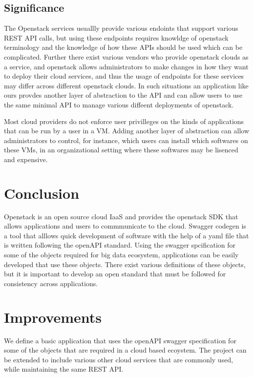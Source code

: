 \subsection{Significance}
The Openstack services usuallly provide various endoints that support
various REST API calls, but using these endpoints requires knowldge of
openstack terminology and the knowledge of how these APIs should be
used which can be complicated. Further there exist various vendors who
provide openstack clouds as a service, and openstack allows
administrators to make changes in how they want to deploy their cloud
services, and thus the usage of endpoints for these services may
differ across different openstack clouds. In such situations an
application like ours provdes another layer of abstraction to the API
and can allow users to use the same minimal API to manage various
diffeent deployments of openstack.

Most cloud providers do not enforce user privilleges on the kinds of
applications that can be run by a user in a VM. Adding another layer
of abstraction can allow administrators to control, for instance,
which users can install which softwares on these VMs, in an
organizational setting where these softwares may be lisenced and
expensive.

\section{Conclusion}
Openstack is an open source cloud IaaS and provides the openstack SDK
that allows applications and users to commmunicate to the
cloud. Swagger codegen is a tool that alllows quick development of
software with the help of a yaml file that is written following the
openAPI standard. Using the swagger spcification for some of the
objects required for big data ecosystem, applications can be easily
developed that use these objects. There exist various definitions of
these objects, but it is important to develop an open standard that
must be followed for consistency across applications.

\section{Improvements}
We define a basic application that uses the openAPI swagger
specification for some of the objects that are required in a cloud
based ecoystem. The project can be extended to include various other
cloud services that are commonly used, while maintaining the same REST
API.

